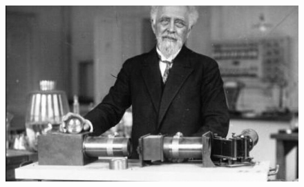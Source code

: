 \vspace{4cm}

\begin{figure}[h]
	\begin{center}
		\includegraphics[width=16cm]{02_body/introduction/image/perrin.jpg}
	\end{center}
\end{figure}